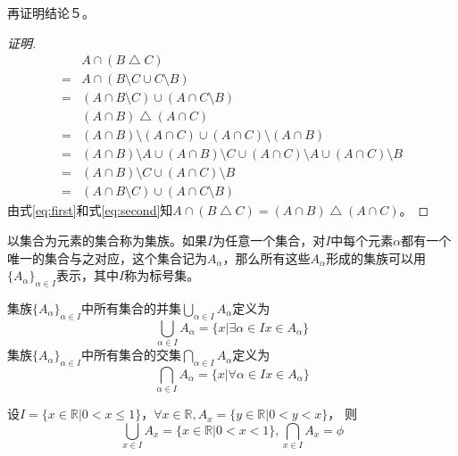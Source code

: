 再证明结论５。

\begin{proof}[证明]
   \begin{align}
    &A\cap (B\bigtriangleup C)\nonumber \\
    =&A\cap (B\setminus C \cup C\setminus B) \nonumber \\
    =&(A\cap B\setminus C) \cup (A \cap C\setminus B) \label{eq:first} \\      
    &(A\cap B)\bigtriangleup (A\cap C) \nonumber \\
    =&(A\cap B)\setminus (A\cap C) \cup (A\cap C)\setminus (A\cap B) \nonumber \\
    =&(A\cap B)\setminus A \cup (A\cap B)\setminus C \cup (A\cap C)\setminus A \cup (A\cap C)\setminus B \nonumber \\
    =&(A\cap B)\setminus C \cup (A\cap C)\setminus B \nonumber \\
    =&(A\cap B\setminus C) \cup (A \cap C\setminus B)\label{eq:second}      
   \end{align}
由式\eqref{eq:first}和式\eqref{eq:second}知$A\cap (B\bigtriangleup C)=(A\cap B)\bigtriangleup (A\cap C)$。
\end{proof}
  \begin{Def}  
    以集合为元素的集合称为集族。如果$I$为任意一个集合，对$I$中每个元素$\alpha$都有一个唯一的集合与之对应，这个集合记为$A_{\alpha}$，那么所有这些$A_{\alpha}$形成的集族可以用$\{A_{\alpha}\}_{\alpha \in I}$表示，其中$I$称为标号集。
  \end{Def}
  \begin{Def}
    集族$\{A_{\alpha}\}_{\alpha \in I}$中所有集合的并集$\bigcup_{\alpha \in I}A_{\alpha}$定义为
\[ \bigcup_{\alpha \in I}A_{\alpha} = \{x|\exists \alpha \in I  x \in A_{\alpha}\}\]
    集族$\{A_{\alpha}\}_{\alpha \in I}$中所有集合的交集$\bigcap_{\alpha \in I}A_{\alpha}$定义为
\[ \bigcap_{\alpha \in I}A_{\alpha} = \{x|\forall \alpha \in I x \in A_{\alpha}\}\]
  \end{Def}

  \begin{Example}
    设$I=\{x \in \mathbb{R} | 0 < x \leq 1\}$，$\forall x \in \mathbb{R}, A_x=\{y\in \mathbb{R}|0 < y < x\}$，
    则
    \begin{equation*}
      \bigcup_{x\in I}A_x=\{x \in \mathbb{R} | 0 < x < 1\},
      \bigcap_{x\in I}A_x=\phi      
    \end{equation*}
  \end{Example}

